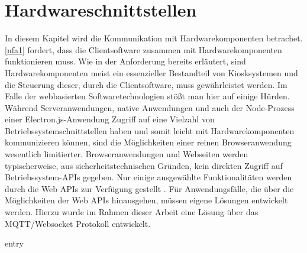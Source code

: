 \chapter{Hardwareschnittstellen}
\label{chap:hardwareschnittstellen}

In diesem Kapitel wird die Kommunikation mit Hardwarekomponenten betrachet.
\ref{nfa1} fordert, dass die Clientsoftware zusammen mit Hardwarekomponenten funktionieren muss. Wie in
der Anforderung bereits erläutert, sind Hardwarekomponenten meist ein essenzieller Bestandteil von Kiosksystemen
und die Steuerung dieser, durch die Clientsoftware, muss gewährleistet werden. Im Falle der webbasierten 
Softwaretechnologien stößt man hier auf einige Hürden.\\
Während Serveranwendungen, native Anwendungen und auch der Node-Prozess einer 
Electron.js-Anwendung Zugriff auf eine Vielzahl von Betriebssystemschnittstellen haben  
und somit leicht mit Hardwarekomponenten kommunizieren können, sind
die Möglichkeiten einer reinen Browseranwendung wesentlich limitierter. Browseranwendungen und Webseiten werden
typischerweise, aus sicherheitstechnischen Gründen, kein direkten Zugriff auf Betriebssystem-APIs gegeben.
Nur einige ausgewählte Funktionalitäten werden durch die Web APIs zur Verfügung gestellt \cite{web-apis}.
Für Anwendungsfälle, die über die Möglichkeiten der Web APIs hinausgehen, müssen eigene Lösungen entwickelt 
werden. Hierzu wurde im Rahmen dieser Arbeit eine Lösung über das MQTT/Websocket Protokoll entwickelt.


{entry}